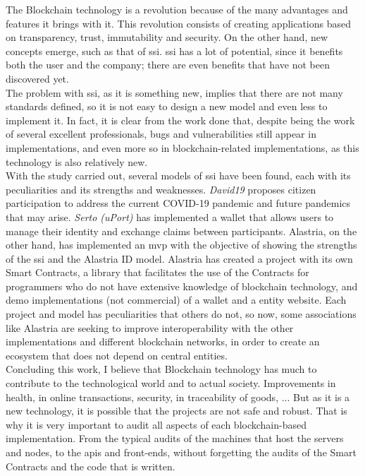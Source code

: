  The Blockchain technology is a revolution because of the many advantages and features it brings with it.  This revolution consists of creating applications based on transparency, trust, immutability and security. On the other hand, new concepts emerge, such as that of \acrlong{ssi}. \acrlong{ssi} has a lot of potential, since it benefits both the user and the company; there are even benefits that have not been discovered yet.\\
    
    The problem with \acrlong{ssi}, as it is something new, implies that there are not many standards defined, so it is not easy to design a new model and even less to implement it. In fact, it is clear from the work done that, despite being the work of several excellent professionals, bugs and vulnerabilities still appear in implementations, and even more so in blockchain-related implementations, as this technology is also relatively new.\\
    
    With the study carried out, several models of \acrshort{ssi} have been found, each with its peculiarities and its strengths and weaknesses. \textit{David19} proposes citizen participation to address the current COVID-19 pandemic and future pandemics that may arise. \textit{Serto (uPort)} has implemented a wallet that allows users to manage their identity and exchange claims between participants. Alastria, on the other hand, has implemented an \acrlong{mvp} with the objective of showing the strengths of the \acrshort{ssi} and the Alastria ID model. Alastria has created a project with its own Smart Contracts, a library that facilitates the use of the Contracts for programmers who do not have extensive knowledge of blockchain technology, and demo implementations (not commercial) of a wallet and a entity website. Each project and model has peculiarities that others do not, so now, some associations like Alastria are seeking to improve interoperability with the other implementations and different blockchain networks, in order to create an ecosystem that does not depend on central entities.\\
    
    Concluding this work, I believe that Blockchain technology has much to contribute to the technological world and to actual society. Improvements in health, in online transactions, security, in traceability of goods, ... But as it is a new technology, it is possible that the projects are not safe and robust. That is why it is very important to audit all aspects of each blockchain-based implementation. From the typical audits of the machines that host the servers and nodes, to the \acrshort{api}s and front-ends, without forgetting the audits of the Smart Contracts and the code that is written.\\
    
